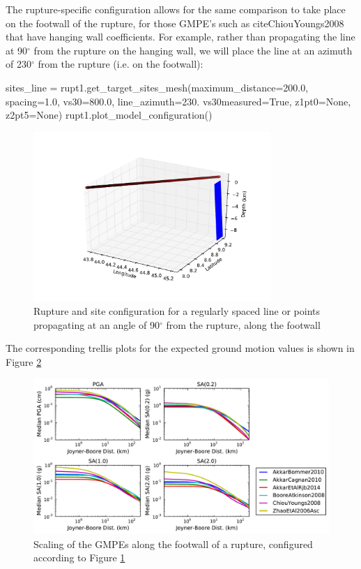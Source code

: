 The rupture-specific configuration allows for the same comparison to take place on the footwall of the rupture, for those GMPE's such as citeChiouYoungs2008 that have hanging wall coefficients. For example, rather than propagating the line at 90$^{\circ}$ from the rupture on the hanging wall, we will place the line at an azimuth of 230$^{\circ}$ from the rupture (i.e. on the footwall):

\begin{python}
sites_line = rupt1.get_target_sites_mesh(maximum_distance=200.0,
                                         spacing=1.0,
                                         vs30=800.0,
                                         line_azimuth=230.
                                         vs30measured=True,
                                         z1pt0=None,
                                         z2pt5=None)
rupt1.plot_model_configuration()
\end{python}

\begin{figure}[htbp]
	\centering
		\includegraphics[width=9cm]{./figures/trellis/rupt_config_footwall.pdf}
	\caption{Rupture and site configuration for a regularly spaced line or points propagating at an angle of 90$^{\circ}$ from the rupture, along the  footwall}
	\label{fig:rupt_config_footwall}
\end{figure}

The corresponding trellis plots for the expected ground motion values is shown in Figure \ref{fig:distance_footwall_trellis_rupt}
\begin{figure}[htb]
	\centering
		\includegraphics[width=\textwidth]{./figures/trellis/distance_footwall_trellis_rupt.pdf}
	\caption{Scaling of the GMPEs along the footwall of a rupture, configured according to Figure \ref{fig:rupt_config_footwall}}
	\label{fig:distance_footwall_trellis_rupt}
\end{figure}

